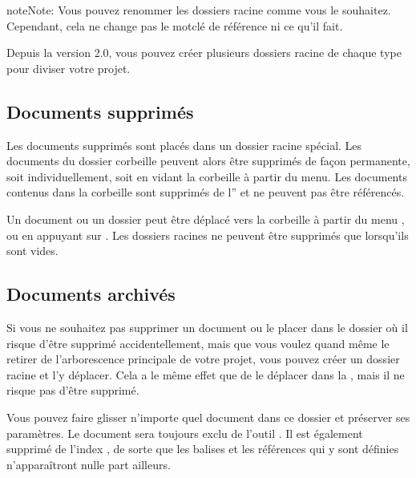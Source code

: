 \documentclass[a4paper,11pt,french]{sphinxmanual}
\begin{document}
\begin{sphinxadmonition}{note}{Note:}
\sphinxAtStartPar
Vous pouvez renommer les dossiers racine comme vous le souhaitez. Cependant, cela ne change pas le mot\sphinxhyphen{}clé de référence ni ce qu’il fait.
\end{sphinxadmonition}

\sphinxAtStartPar
{}Depuis la version 2.0, vous pouvez créer plusieurs dossiers racine de chaque type pour diviser votre projet.


\subsection{Documents supprimés}
\label{\detokenize{project_overview:deleted-documents}}\label{\detokenize{project_overview:a-proj-roots-del}}
\sphinxAtStartPar
Les documents supprimés sont placés dans un dossier racine  spécial. Les documents du dossier corbeille peuvent alors être supprimés de façon permanente, soit individuellement, soit en vidant la corbeille à partir du menu. Les documents contenus dans la corbeille sont supprimés de l”{\hyperref[\detokenize{int_glossary:term-Project-Index}]{}} et ne peuvent pas être référencés.

\sphinxAtStartPar
Un document ou un dossier peut être déplacé vers la corbeille à partir du menu , ou en appuyant sur . Les dossiers racines ne peuvent être supprimés que lorsqu’ils sont vides.


\subsection{Documents archivés}
\label{\detokenize{project_overview:archived-documents}}\label{\detokenize{project_overview:a-proj-roots-out}}
\sphinxAtStartPar
Si vous ne souhaitez pas supprimer un document ou le placer dans le dossier  où il risque d’être supprimé accidentellement, mais que vous voulez quand même le retirer de l’arborescence principale de votre projet, vous pouvez créer un dossier racine  et l’y déplacer. Cela a le même effet que de le déplacer dans la , mais il ne risque pas d’être supprimé.

\sphinxAtStartPar
Vous pouvez faire glisser n’importe quel document dans ce dossier et préserver ses paramètres. Le document sera toujours exclu de l’outil . Il est également supprimé de l’index {\hyperref[\detokenize{int_glossary:term-Project-Index}]{}}, de sorte que les balises et les références qui y sont définies n’apparaîtront nulle part ailleurs.
\end{document}
